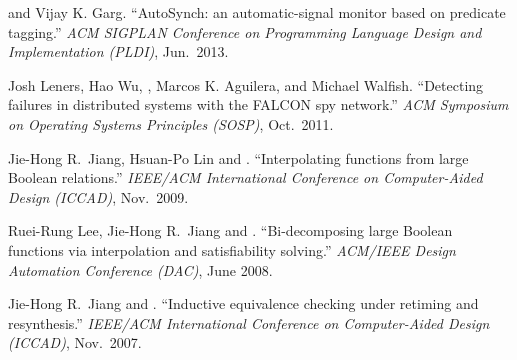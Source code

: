 

\begin{myenumerate}
    \item {} and Vijay K. Garg. ``AutoSynch: an
        automatic-signal monitor based on predicate tagging.'' {\it ACM SIGPLAN
        Conference on Programming Language Design and Implementation (PLDI)},
        Jun.~2013. 
    \item Josh Leners, Hao Wu, , Marcos K. Aguilera, and 
        Michael Walfish. ``Detecting failures in distributed systems with the 
        FALCON spy network.'' {\it ACM Symposium on Operating Systems 
        Principles (SOSP)}, Oct.~2011.
    \item Jie-Hong R.~Jiang, Hsuan-Po Lin and  .
        ``Interpolating functions from large Boolean relations.'' {\it  
        IEEE/ACM International Conference on Computer-Aided Design (ICCAD)},  
        Nov.~2009.
    \item Ruei-Rung Lee, Jie-Hong R.~Jiang and . 
        ``Bi-decomposing large Boolean functions via interpolation and 
        satisfiability solving.'' {\it ACM/IEEE Design Automation Conference 
        (DAC)}, June 2008. %
    \item Jie-Hong R.~Jiang and . ``Inductive equivalence 
        checking under retiming and resynthesis.'' {\it IEEE/ACM International 
        Conference on Computer-Aided Design (ICCAD)}, Nov.~2007.
\end{myenumerate}
